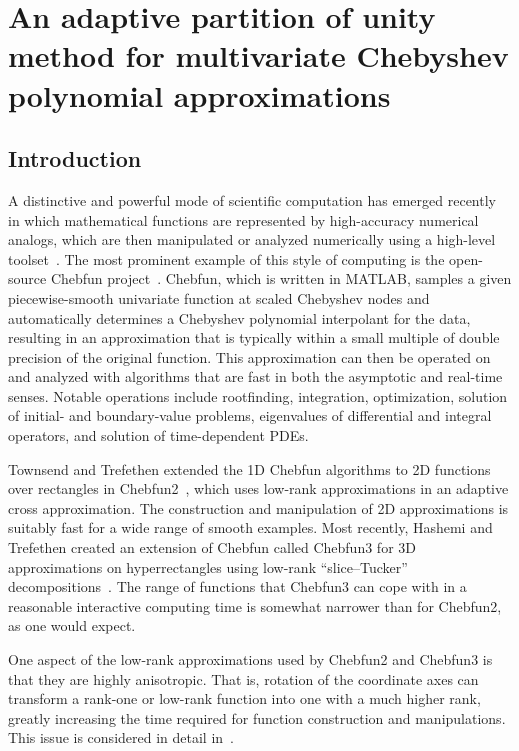 \chapter{An adaptive partition of unity method for multivariate Chebyshev polynomial approximations}

\section{Introduction}
\label{sec:introduction}

A distinctive and powerful mode of scientific computation has emerged recently in which mathematical functions are represented by high-accuracy numerical analogs, which are then manipulated or analyzed numerically using a high-level toolset~\cite{Trefethen2015}. The most prominent example of this style of computing is the open-source Chebfun project~\cite{battles2004extension,Driscoll2014}. Chebfun, which is written in MATLAB, samples a given piecewise-smooth univariate function at scaled Chebyshev nodes and automatically determines a Chebyshev polynomial interpolant for the data, resulting in an approximation that is typically within a small multiple of double precision of the original function. This approximation can then be operated on and analyzed with algorithms that are fast in both the asymptotic and real-time senses. Notable operations include rootfinding, integration, optimization, solution of initial- and boundary-value problems, eigenvalues of differential and integral operators, and solution of time-dependent PDEs.

Townsend and Trefethen extended the 1D Chebfun algorithms to 2D functions over rectangles in Chebfun2~\cite{townsend2013extension,Townsend2014}, which uses low-rank approximations in an adaptive cross approximation. The construction and manipulation of 2D approximations is suitably fast for a wide range of smooth examples. Most recently, Hashemi and Trefethen created an extension of Chebfun called Chebfun3 for 3D approximations on hyperrectangles using low-rank ``slice--Tucker'' decompositions~\cite{Hashemi2017}. The range of functions that Chebfun3 can cope with in a reasonable interactive computing time is somewhat narrower than for Chebfun2, as one would expect.

One aspect of the low-rank approximations used by Chebfun2 and Chebfun3 is that they are highly anisotropic. That is, rotation of the coordinate axes can transform a rank-one or low-rank function into one with a much higher rank, greatly increasing the time required for function construction and manipulations. This issue is considered in detail in~\cite{trefethen2017cubature}. 

